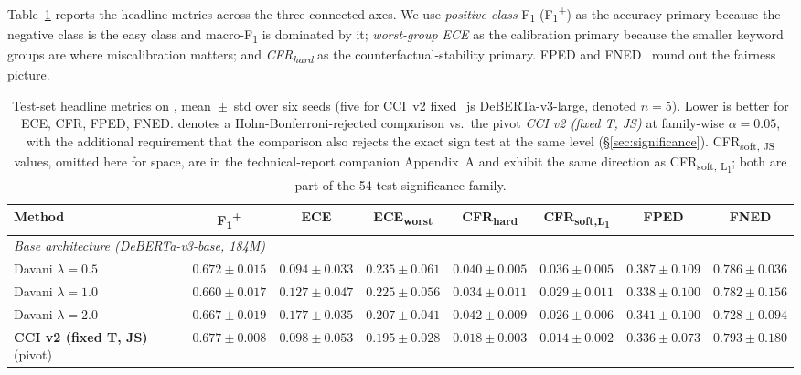 Table~\ref{tab:main_results} reports the headline metrics across the three connected axes. We use \emph{positive-class} F\textsubscript{1} (F\textsubscript{1}\textsuperscript{+}) as the accuracy primary because the negative class is the easy class and macro-F\textsubscript{1} is dominated by it; \emph{worst-group ECE} as the calibration primary because the smaller keyword groups are where miscalibration matters; and \emph{CFR\textsubscript{hard}} as the counterfactual-stability primary. FPED and FNED~\citep{dixon2018measuring} round out the fairness picture.

\begin{table}[t]
\centering
\caption{Test-set headline metrics on \dataset{}, mean~$\pm$~std over six seeds (five for CCI~v2 fixed\_js DeBERTa-v3-large, denoted $n=5$). Lower is better for ECE, CFR, FPED, FNED. \textbf{\*} denotes a Holm-Bonferroni-rejected comparison vs.\ the pivot \emph{CCI v2 (fixed T, JS)} at family-wise $\alpha = 0.05$, with the additional requirement that the comparison also rejects the exact sign test at the same level (\S\ref{sec:significance}). CFR\textsubscript{soft, JS} values, omitted here for space, are in the technical-report companion Appendix~A and exhibit the same direction as CFR\textsubscript{soft, L\textsubscript{1}}; both are part of the 54-test significance family.}
\label{tab:main_results}
\scriptsize
\setlength{\tabcolsep}{3pt}
\begin{tabular}{@{}lccccccc@{}}
\toprule
\textbf{Method} & \textbf{F\textsubscript{1}\textsuperscript{+}} & \textbf{ECE} & \textbf{ECE\textsubscript{worst}} & \textbf{CFR\textsubscript{hard}} & \textbf{CFR\textsubscript{soft,L\textsubscript{1}}} & \textbf{FPED} & \textbf{FNED} \\
\midrule
\multicolumn{8}{l}{\emph{Base architecture (DeBERTa-v3-base, 184M)}} \\
Davani $\lambda=0.5$            & $0.672 \pm 0.015$ & $0.094 \pm 0.033$ & $0.235 \pm 0.061$ & $0.040 \pm 0.005$\textbf{\*} & $0.036 \pm 0.005$\textbf{\*} & $0.387 \pm 0.109$ & $0.786 \pm 0.036$ \\
Davani $\lambda=1.0$            & $0.660 \pm 0.017$ & $0.127 \pm 0.047$ & $0.225 \pm 0.056$ & $0.034 \pm 0.011$ & $0.029 \pm 0.011$ & $0.338 \pm 0.100$ & $0.782 \pm 0.156$ \\
Davani $\lambda=2.0$            & $0.667 \pm 0.019$ & $0.177 \pm 0.035$ & $0.207 \pm 0.041$ & $0.042 \pm 0.009$ & $0.026 \pm 0.006$ & $0.341 \pm 0.100$ & $\mathbf{0.728 \pm 0.094}$ \\
\textbf{CCI v2 (fixed T, JS)} (pivot) & $\mathbf{0.677 \pm 0.008}$ & $0.098 \pm 0.053$ & $0.195 \pm 0.028$ & $0.018 \pm 0.003$ & $0.014 \pm 0.002$ & $0.336 \pm 0.073$ & $0.793 \pm 0.180$ \\

\end{tabular}
\end{table}
